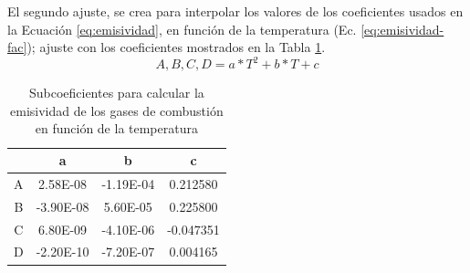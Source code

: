 \par El segundo ajuste, se crea para interpolar los valores de los coeficientes usados en la Ecuación \ref{eq:emisividad}, en función de la temperatura (Ec. \ref{eq:emisividad-fac}); ajuste con los coeficientes mostrados en la Tabla \ref{tbl:emisividad-fac}.
\begin{equation}
\label{eq:emisividad-fac}
A, B, C, D = a*T^2+b*T+c
\end{equation}
\begin{table}[H]
\caption{Subcoeficientes para calcular la emisividad de los gases de combustión en función de la temperatura}
\label{tbl:emisividad-fac}
\centering
\begin{tabular}{c|c|c|c}		
	& a         & b	        & c \\
	\hline
A	&  2.58E-08	& -1.19E-04	& 0.212580 \\
B	& -3.90E-08	&  5.60E-05	& 0.225800 \\
C	&  6.80E-09	& -4.10E-06	&-0.047351 \\
D	& -2.20E-10	& -7.20E-07	& 0.004165 \\
\end{tabular}
\end{table}

